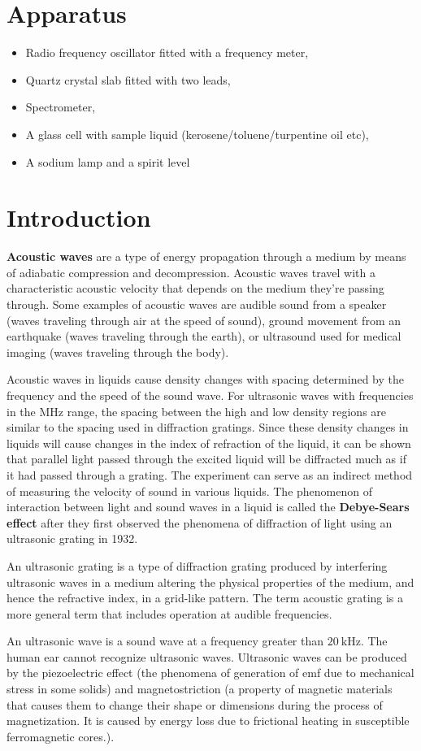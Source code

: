 \documentclass{article}
\begin{document}
\section{Apparatus}
\begin{itemize}
    \item Radio frequency oscillator fitted with a frequency meter,
    \item Quartz crystal slab fitted with two leads,
    \item Spectrometer,
    \item A glass cell with sample liquid (kerosene/toluene/turpentine oil etc),
    \item A sodium lamp and a spirit level
\end{itemize}

\section{Introduction}
\noindent
\textbf{Acoustic waves} are a type of energy propagation through a medium by means of adiabatic compression and decompression. Acoustic waves travel with a characteristic acoustic velocity that depends on the medium they're passing through. Some examples of acoustic waves are audible sound from a speaker (waves traveling through air at the speed of sound), ground movement from an earthquake (waves traveling through the earth), or ultrasound used for medical imaging (waves traveling through the body).
\par
\noindent
Acoustic waves in liquids cause density changes with spacing determined by the 
frequency and the speed of the sound wave. For ultrasonic waves with frequencies in the $\si{\mega \hertz}$ range, the spacing between the high and low density regions are similar to the spacing used in diffraction gratings. Since these density changes in liquids will cause changes in the index of refraction of the liquid, it can be shown that parallel light passed through the excited liquid will be diffracted much as if it had passed through a grating. The experiment can serve as an indirect method of measuring the velocity of sound in various liquids. The phenomenon of interaction between light and sound waves in a liquid is called the \textbf{Debye-Sears effect} after they first observed the phenomena of diffraction of light using an ultrasonic grating in 1932.
\par
\noindent
An ultrasonic grating is a type of diffraction grating produced by interfering ultrasonic waves in a medium altering the physical properties of the medium, and hence the refractive index, in a grid-like pattern. The term acoustic grating is a more general term that includes operation at audible frequencies.
\par
\noindent
An ultrasonic wave is a sound wave at a frequency greater than $\SI{20}{\kilo \hertz}$. The human ear cannot recognize ultrasonic waves. Ultrasonic waves can be produced by the piezoelectric effect (the phenomena of generation of emf due to mechanical stress in some solids) and magnetostriction (a property of magnetic materials that causes them to change their shape or dimensions during the process of magnetization. It is caused by  energy loss due to frictional heating in susceptible ferromagnetic cores.).
\end{document}
